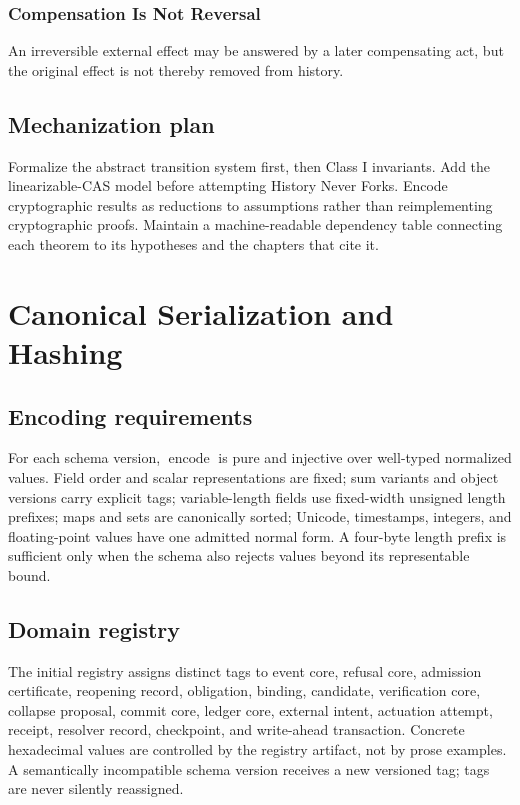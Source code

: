 \documentclass[11pt,openany]{book}
\begin{document}
\subsection{Compensation Is Not Reversal}
An irreversible external effect may be answered by a later compensating act,
but the original effect is not thereby removed from history.

\section{Mechanization plan}
Formalize the abstract transition system first, then Class I invariants. Add
the linearizable-CAS model before attempting History Never Forks. Encode
cryptographic results as reductions to assumptions rather than reimplementing
cryptographic proofs. Maintain a machine-readable dependency table connecting
each theorem to its hypotheses and the chapters that cite it.

\chapter{Canonical Serialization and Hashing}
\section{Encoding requirements}
For each schema version, \(\operatorname{encode}\) is pure and injective over
well-typed normalized values. Field order and scalar representations are fixed;
sum variants and object versions carry explicit tags; variable-length fields
use fixed-width unsigned length prefixes; maps and sets are canonically sorted;
Unicode, timestamps, integers, and floating-point values have one admitted
normal form. A four-byte length prefix is sufficient only when the schema also
rejects values beyond its representable bound.

\section{Domain registry}
The initial registry assigns distinct tags to event core, refusal core,
admission certificate, reopening record, obligation, binding, candidate,
verification core, collapse proposal, commit core, ledger core, external
intent, actuation attempt, receipt, resolver record, checkpoint, and
write-ahead transaction. Concrete hexadecimal values are controlled by the
registry artifact, not by prose examples. A semantically incompatible schema
version receives a new versioned tag; tags are never silently reassigned.
\end{document}
